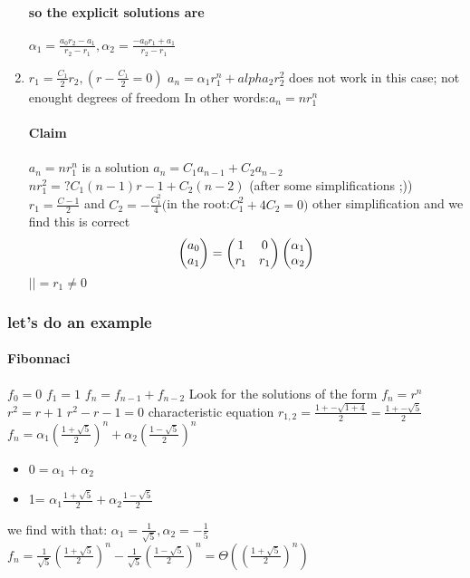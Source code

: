 \documentclass[a4paper,10pt]{article}
\begin{document}
\begin{enumerate}
\paragraph{so the explicit solutions are}
$\alpha_1=\frac{a_0r_2-a_1}{r_2-r_1},\alpha_2=\frac{-a_0r_1+a_1}{r_2-r_1}$
 \item $r_1=\frac{C_1}{2}r_2,(r-\frac{C_1}{2}=0)$
 \subitem $a_n=\alpha_1r_1^n+alpha_2r_2^2$ does not work in this case; not enought degrees of freedom
 \newline
 In other words:$a_n=nr_1^n$
 \paragraph{Claim}
 $a_n=nr_1^n$ is a solution
 \newline
 $a_n=C_1a_{n-1}+C_2a_{n-2}$
 \newline
 $nr_1^2=?C_1(n-1)r-1+C_2(n-2)$ (after some simplifications ;))
 \newline
 $r_1=\frac{C-1}{2}$ and $C_2=-\frac{C_1^2}{4}($in the root:$C_1^2+4C_2=0)$
 \newline
 other simplification and we find this is correct
\[
\begin{pmatrix}
 a_0\cr
 a_1\cr
\end{pmatrix}
=
\begin{pmatrix}
 1&0\cr
 r_1&r_1\cr
\end{pmatrix}
\begin{pmatrix}
\alpha_1\cr
\alpha_2\cr
\end{pmatrix}
\]
\newline
$||=r_1\neq 0$
 \end{enumerate}
\subsubsection{let's do an example}
\paragraph{Fibonnaci}
$f_0=0$ $f_1=1$ $f_n=f_{n-1}+f_{n-2}$
\newline
Look for the solutions of the form $f_n=r^n$
\newline
$r^2=r+1$
\newline
$r^2-r-1=0$ characteristic equation
\newline
$r_{1,2}=\frac{1+-\sqrt{1+4}}{2}=\frac{1+-\sqrt{5}}{2}$
\newline
$f_n=\alpha_1(\frac{1+\sqrt{5}}{2})^n+\alpha_2(\frac{1-\sqrt{5}}{2})^n$
\begin{itemize}
 \item $0=\alpha_1+\alpha_2$
 \item 1= $\alpha_1\frac{1+\sqrt{5}}{2}+\alpha_2\frac{1-\sqrt{5}}{2}$
\end{itemize}
we find with that: $\alpha_1=\frac{1}{\sqrt{5}},\alpha_2=-\frac{1}{5}$
\newline
$f_n=\frac{1}{\sqrt{5}}(\frac{1+\sqrt{5}}{2})^n-\frac{1}{\sqrt{5}}(\frac{1-\sqrt{5}}{2})^n=\Theta((\frac{1+\sqrt{5}}{2})^n)$
\end{document}
